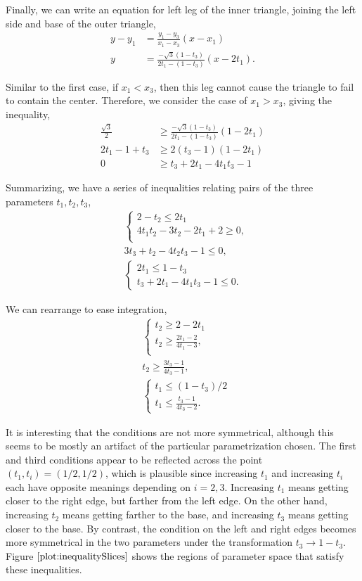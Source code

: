 \documentclass[reqno]{amsart}
\begin{document}
Finally, we can write an equation for left leg of the inner triangle, joining the left side and base of the outer triangle,
\begin{align*}
y-y_1 &= \frac{y_1-y_3}{x_1-x_3}(x-x_1) \\
y &= \frac{-\sqrt{3}(1-t_3)}{2t_1-(1-t_3)}(x-2t_1).
\end{align*}

Similar to the first case, if $x_1<x_3$, then this leg cannot cause the triangle to fail to contain the center. Therefore, we consider the case of $x_1>x_3$, giving the inequality,
\begin{align*}
\frac{\sqrt{3}}{2} &\geq \frac{-\sqrt{3}(1-t_3)}{2t_1-(1-t_3)}(1-2t_1) \\
2t_1-1+t_3&\geq 2(t_3-1)(1-2t_1) \\
0 &\geq t_3+2t_1-4t_1t_3-1
\end{align*} 

Summarizing, we have a series of inequalities relating pairs of the three parameters $t_1, t_2, t_3$,
\begin{align*}
&\begin{cases}
2-t_2 \leq 2t_1 \\
4t_1 t_2 -3t_2-2t_1+2\geq 0,\\
\end{cases} \\
&3t_3+t_2-4t_2 t_3-1\leq 0, \\
&\begin{cases}
2t_1 \leq 1-t_3 \\
t_3+2t_1-4t_1t_3-1 \leq 0.
\end{cases}
\end{align*}

We can rearrange to ease integration,
\begin{align*}
&\begin{cases}
t_2 \geq 2-2t_1 \\
t_2\geq \frac{2t_1-2}{4t_1-3},\\
\end{cases} \\
&t_2 \geq \frac{3t_3-1}{4t_3-1}, \\
&\begin{cases}
t_1 \leq (1-t_3)/2 \\
t_1 \leq \frac{t_3-1}{4t_3-2}.
\end{cases}
\end{align*}

It is interesting that the conditions are not more symmetrical, although this seems to be mostly an artifact of the particular parametrization chosen. The first and third conditions appear to be reflected across the point $(t_1, t_i) =(1/2, 1/2)$, which is plausible since increasing $t_1$ and increasing $t_i$ each have opposite meanings depending on $i=2,3$. Increasing $t_1$ means getting closer to the right edge, but farther from the left edge. 
On the other hand, increasing $t_2$ means getting farther to the base, and increasing $t_3$ means getting closer to the base. By contrast, the condition on the left and right edges becomes more symmetrical in the two parameters under the transformation $t_3 \rightarrow 1-t_3$. Figure $\ref{plot:inequalitySlices}$ shows the regions of parameter space that satisfy these inequalities.
\end{document}
